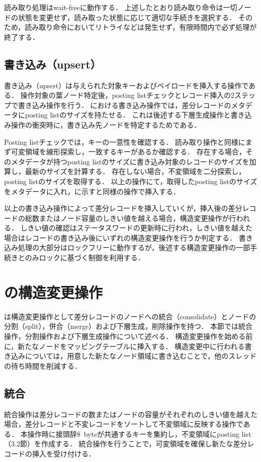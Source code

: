 読み取り処理はwait-freeに動作する．
上述したとおり読み取り命令は一切ノードの状態を変更せず，読み取った状態に応じて適切な手続きを選択する．
そのため，読み取り命令においてリトライなどは発生せず，有限時間内で必ず処理が終了する．

\subsection{書き込み（upsert）}
書き込み（upsert）は与えられた対象キーおよびペイロードを挿入する操作である．
操作対象の葉ノード特定後，posting listチェックとレコード挿入の2ステップで書き込み操作を行う．
\Bcforest{}における書き込み操作では，差分レコードのメタデータにposting listのサイズを持たせる．
これは後述する下層生成操作と書き込み操作の衝突時に，書き込み先ノードを特定するためである．

Posting listチェックでは，キーの一意性を確認する．
読み取り操作と同様にまず可変領域を線形探索し，一致するキーがあるか確認する．
存在する場合，そのメタデータが持つposting listのサイズに書き込み対象のレコードのサイズを加算し，最新のサイズを計算する．
存在しない場合，不変領域を二分探索し，posting listのサイズを取得する．
以上の操作にて，取得したposting listのサイズをメタデータに入れ，\Fig{\ref{fig:bc_tree_insertion}}に示す\Bctree{}と同様の操作で挿入する．

以上の書き込み操作によって差分レコードを挿入していくが，挿入後の差分レコードの総数またはノード容量のしきい値を越える場合，構造変更操作が行われる．
しきい値の確認はステータスワードの更新時に行われ，しきい値を越えた場合はレコードの書き込み後にいずれの構造変更操作を行うか判定する．
書き込み処理の大部分はロックフリーに動作するが，後述する構造変更操作の一部手続きとのみロックに基づく制御を利用する．

\section{\Bcforest{}の構造変更操作}
\label{sec:smo}
\Bcforest{}は構造変更操作として差分レコードのノードへの統合（consolidate）とノードの分割（split），併合（merge）および下層生成，削除操作を持つ．
本節では統合操作，分割操作および下層生成操作について述べる．
構造変更操作を始める前に，新たなノードをマッピングテーブルに挿入する．
構造変更中に行われる書き込みについては，用意した新たなノード領域に書き込むことで，他のスレッドの待ち時間を削減する．

\subsection{統合}
統合操作は差分レコードの数またはノードの容量がそれぞれのしきい値を越えた場合，差分レコードと不変レコードをソートして不変領域に反映する操作である．
本操作時に接頭辞8~byteが共通するキーを集約し，不変領域にposting list（3.2節）を作成する．
統合操作を行うことで，可変領域を確保し新たな差分レコードの挿入を受け付ける．

